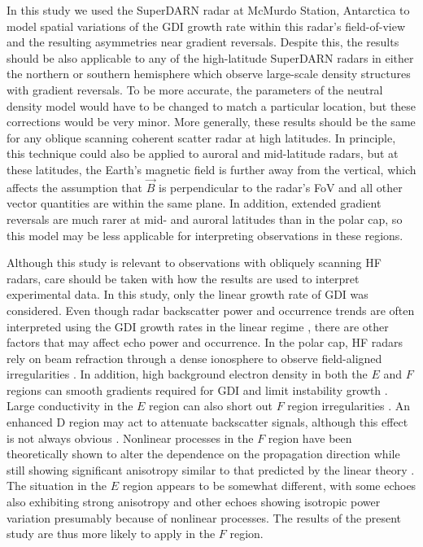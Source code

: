 In this study we used the SuperDARN radar at McMurdo Station, Antarctica to model spatial variations of the GDI growth rate within this radar's field-of-view and the resulting asymmetries near gradient reversals. Despite this, the results should be also applicable to any of the high-latitude SuperDARN radars in either the northern or southern hemisphere which observe large-scale density structures with gradient reversals. To be more accurate, the parameters of the neutral density model would have to be changed to match a particular location, but these corrections would be very minor. More generally, these results should be the same for any oblique scanning coherent scatter radar at high latitudes.  In principle, this technique could also be applied to auroral and mid-latitude radars, but at these latitudes, the Earth's magnetic field is further away from the vertical, which affects the assumption that \(\vec{B}\) is perpendicular to the radar's FoV and all other vector quantities are within the same plane. In addition, extended gradient reversals are much rarer at mid- and auroral latitudes than in the polar cap, so this model may be less applicable for interpreting observations in these regions. 


Although this study is relevant to observations with obliquely scanning HF radars, care should be taken with how the results are used to interpret experimental data.  In this study, only the linear growth rate of GDI was considered. Even though radar backscatter power and occurrence trends are often interpreted using the GDI growth rates in the linear regime \citep[e.g.][]{Oksavik2012,Moen2012}, there are other factors that may affect echo power and occurrence.  In the polar cap, HF radars rely on beam refraction through a dense ionosphere to observe field-aligned irregularities \citep{Bristow2011,Koustov2014}.  In addition, high background electron density in both the \(E\) and \(F\) regions can smooth gradients required for GDI and limit instability growth \citep{Ruohoniemi1997,Koustov2004}.  Large conductivity in the \(E\) region can also short out \(F\) region irregularities \citep{Danskin2002,Kane2012,Lamarche2015}.  An enhanced D region may act to attenuate backscatter signals, although this effect is not always obvious \citep{Danskin2002}.  Nonlinear processes in the \(F\) region have been theoretically shown to alter the dependence on the propagation direction while still showing significant anisotropy similar to that predicted by the linear theory \citep{Keskinen1981b,Keskinen1982a,Keskinen1983}.  The situation in the \(E\) region appears to be somewhat different, with some echoes also exhibiting strong anisotropy \citep[e.g.][]{Ierkic1980,Makarevich2008} and other echoes showing isotropic power variation \citep{Ierkic1980,Koustov2001} presumably because of nonlinear processes.  The results of the present study are thus more likely to apply in the \(F\) region.


